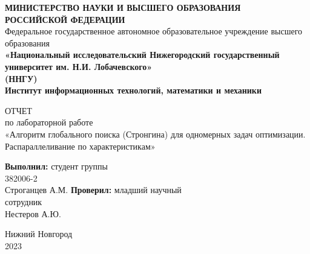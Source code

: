 \documentclass[14pt, a4paper]{extarticle}
\title{}
\author{}
\date{}
\begin{document}
	\begin{titlepage}
		\begin{center}
			{\bfseries МИНИСТЕРСТВО НАУКИ И ВЫСШЕГО ОБРАЗОВАНИЯ \\
				РОССИЙСКОЙ ФЕДЕРАЦИИ}
			\\
			Федеральное государственное автономное образовательное учреждение высшего образования
			\\
			{\bfseries «Национальный исследовательский Нижегородский государственный университет им. Н.И. Лобачевского»\\(ННГУ)
				\\Институт информационных технологий, математики и механики} \\
		\end{center}

		\vspace{8em}

		\begin{center}
			ОТЧЕТ \\ по лабораторной работе \\
			«Алгоритм глобального поиска (Стронгина) для одномерных задач оптимизации. 
			Распараллеливание по характеристикам»
		\end{center}

		\vspace{5em}


		\begin{flushright}
			{\bfseries Выполнил:} студент группы\\382006-2\\Строганцев А.М. \underline{\hspace{3cm}} \linebreak\linebreak\linebreak
			{\bfseries Проверил:} младший научный\\сотрудник\\Нестеров А.Ю. \underline{\hspace{3cm}} 
		\end{flushright}


		\vspace{\fill}

		\begin{center}
			Нижний Новгород\\2023
		\end{center}

	\end{titlepage}

	\tableofcontents
	\thispagestyle{empty}
	\newpage
\end{document}
